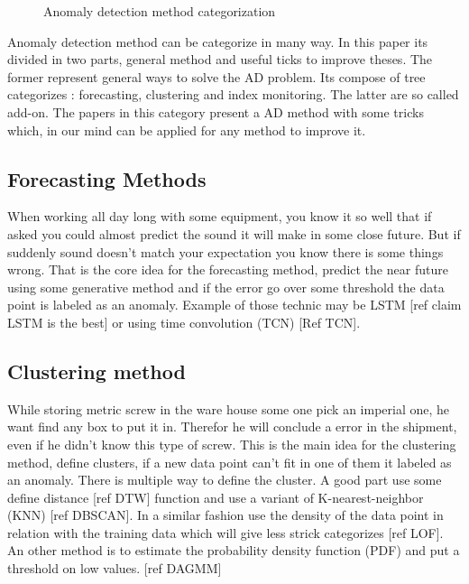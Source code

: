 \documentclass[../../main/main.tex]{subfiles}
\begin{document}
    \begin{figure*}[hp]
        \makebox[\textwidth]{}
        \caption{Anomaly detection method categorization}
    \end{figure*}

    Anomaly detection method can be categorize in many way. In this paper its divided in two parts,
    general method and useful ticks to improve theses. The former represent general ways to 
    solve the AD problem. Its compose of tree categorizes : forecasting, clustering and index monitoring.
    The latter are so called add-on. The papers in this category present a AD method with some tricks which,
    in our mind can be applied for any method to improve it.
    \subsection{Forecasting Methods}
        When working all day long with some equipment, you know it so well that if asked you could almost 
        predict the sound it will make in some close future. But if suddenly sound doesn't match 
        your expectation  you know there is some things wrong.
        That is the core idea for the forecasting method, predict the near future using some generative method
        and if the error go over some threshold the data point is labeled as an anomaly. Example of those technic 
        may be LSTM [ref claim LSTM is the best] or using time convolution (TCN) [Ref TCN].
    
    \subsection{Clustering method}
        While storing metric screw in the ware house some one pick an imperial one, he want find any box to put it in.
        Therefor he will conclude a error in the shipment, even if he didn't know this type of screw. This is the main 
        idea for the clustering method, define clusters, if a new data point can't fit in one of them it labeled as an anomaly.  
        There is multiple way to define the cluster. A good part use some define distance [ref DTW] function and use a variant of K-nearest-neighbor (KNN)
        [ref DBSCAN]. In a similar fashion use the density of the data point in relation with the training data which will 
        give less strick categorizes [ref LOF]. An other method is to estimate the probability density function (PDF) 
        and put a threshold on low values. [ref DAGMM]
\end{document}
